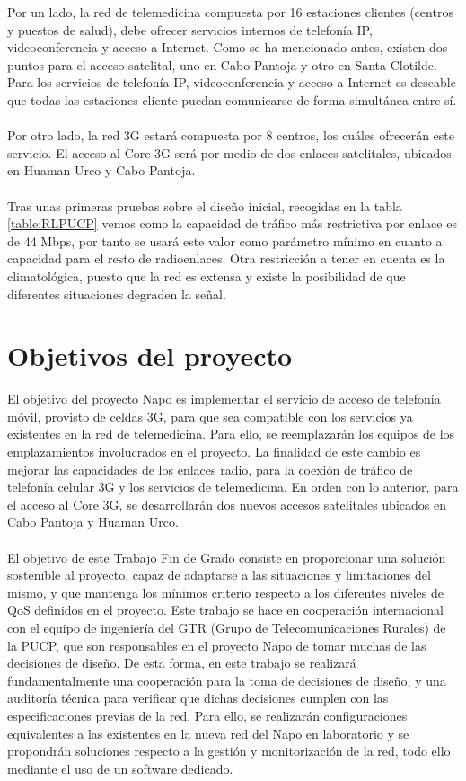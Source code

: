 	Por un lado, la red de telemedicina compuesta por 16 estaciones clientes (centros y puestos de salud), debe ofrecer servicios internos de telefonía IP, videoconferencia y acceso a Internet. Como se ha mencionado antes, existen dos puntos para el acceso satelital, uno en Cabo Pantoja y otro en Santa Clotilde. Para los servicios de telefonía IP, videoconferencia y acceso a Internet es deseable que todas las estaciones cliente puedan comunicarse de forma simultánea entre sí.\\\\
		
	Por otro lado, la red 3G estará compuesta por 8 centros, los cuáles ofrecerán este servicio. El acceso al Core 3G será por medio de dos enlaces satelitales, ubicados en Huaman Urco y Cabo Pantoja.\\\\
	
	Tras unas primeras pruebas sobre el diseño inicial, recogidas en la tabla \ref{table:RLPUCP} vemos como la capacidad de tráfico más restrictiva por enlace es de 44 Mbps, por tanto se usará este valor como parámetro mínimo en cuanto a capacidad para el resto de radioenlaces. Otra restricción a tener en cuenta es la climatológica, puesto que la red es extensa y existe la posibilidad de que diferentes situaciones degraden la señal.
		
\section{Objetivos del proyecto}
	El objetivo del proyecto Napo es implementar el servicio de acceso de telefonía móvil, provisto de celdas 3G, para que sea compatible con los servicios ya existentes en la red de telemedicina. Para ello, se reemplazarán los equipos de los emplazamientos involucrados en el proyecto. La finalidad de este cambio es mejorar las capacidades de los enlaces radio, para la coexión de tráfico de telefonía celular 3G y los servicios de telemedicina. En orden con lo anterior, para el acceso al Core 3G, se desarrollarán dos nuevos accesos satelitales ubicados en Cabo Pantoja y Huaman Urco.\\\\
	
	El objetivo de este Trabajo Fin de Grado consiste en proporcionar una solución sostenible al proyecto, capaz de adaptarse a las situaciones y limitaciones del mismo, y que mantenga los mínimos criterio respecto a los diferentes niveles de QoS definidos en el proyecto. Este trabajo se hace en cooperación internacional con el equipo de ingeniería del GTR (Grupo de Telecomunicaciones Rurales) de la PUCP, que son responsables en el proyecto Napo de tomar muchas de las decisiones de diseño. De esta forma, en este trabajo se realizará fundamentalmente una cooperación para la toma de decisiones de diseño, y una auditoría técnica para verificar que dichas decisiones cumplen con las especificaciones previas de la red. Para ello, se realizarán configuraciones equivalentes a las existentes en la nueva red del Napo en laboratorio y se propondrán soluciones respecto a la gestión y monitorización de la red, todo ello mediante el uso de un software dedicado.
	 
